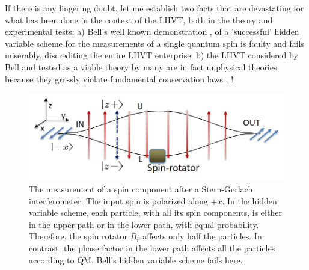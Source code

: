 If there is any lingering doubt, let me establish two facts that are devastating for what
has been done in the context of the LHVT, both in the theory and experimental tests: a)
Bell's well known demonstration \cite{chap14-key12}, \cite{chap14-key13} of a `successful' hidden variable scheme for the
measurements of a single quantum spin is faulty and fails miserably, discrediting the entire
LHVT enterprise. b) the LHVT considered by Bell and tested as a viable theory by many
are in fact unphysical theories because they grossly violate fundamental conservation laws
\cite{chap14-key14}, \cite{chap14-key15}!

\begin{figure}[H]
\centering
\includegraphics[scale=0.6]{src/images/chap27/4.jpg}
\caption{The measurement of a spin component after a Stern-Gerlach interferometer. The input spin
is polarized along $+x$. In the hidden variable scheme, each particle, with all its spin components,
is either in the upper path or in the lower path, with equal probability. Therefore, the spin rotator
$B_r$ affects only half the particles. In contrast, the phase factor in the lower path affects all the
particles according to QM. Bell's hidden variable scheme fails here.}\label{ch14-fig4}
\end{figure}



